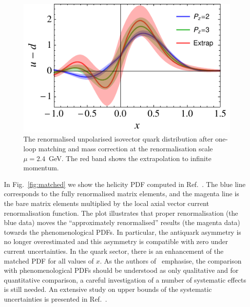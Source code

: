 \begin{figure}[t]
\centering
\includegraphics[width=.6\textwidth]{plots/pdf_nonorm}
\caption{\small The renormalised unpolarised isovector quark distribution after one-loop matching and mass correction at the renormalisation scale $\mu=2.4$~GeV. The red band shows the extrapolation to infinite momentum. 
} \label{fig:final_pdf}
\end{figure}

In Fig.~\ref{fig:matched} we show the helicity PDF computed in Ref.~\cite{Alexandrou:2017huk}. The blue line corresponds to
the fully renormalised matrix elements, and the magenta line is the bare matrix elements multiplied by the local axial vector 
current renormalisation function.
%
The plot illustrates that proper renormalisation (the blue data) moves the ``approximately renormalised'' results (the magenta data) towards the phenomenological PDFs. In particular, the antiquark asymmetry is no longer overestimated and this asymmetry is 
compatible with zero under current uncertainties. In the quark sector, there is an enhancement of the matched PDF for all 
values of $x$. As the authors of~\cite{Alexandrou:2017huk} emphasise, the comparison with phenomenological PDFs should be understood as only qualitative and for quantitative comparison, a careful investigation of a number of systematic effects is still needed. An extensive study 
on upper bounds of the systematic uncertainties is presented in Ref.~\cite{Alexandrou:2017huk}.

